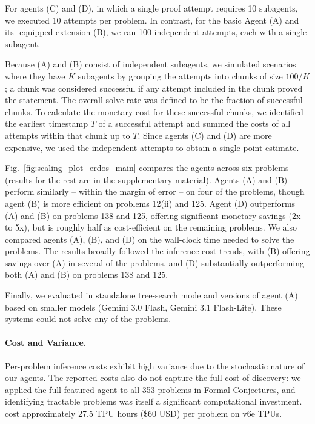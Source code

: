 For agents (C) and (D), in which a single proof attempt requires 10 subagents, 
we executed 10 attempts per problem. In contrast, for the basic Agent (A) and its {\AP}-equipped extension (B), we ran 100 independent attempts, each with a single subagent. 

Because (A) and (B) consist of independent subagents, we simulated scenarios where they have $K$ subagents by grouping the attempts into chunks of size $100/K$; a chunk was considered successful if any attempt included in the chunk proved the statement. The overall solve rate was defined to be the fraction of successful chunks. To calculate the monetary cost for these successful chunks, we identified the earliest timestamp $T$ of a successful attempt and summed the costs of all attempts within that chunk up to $T$. Since 
agents (C) and (D) are more expensive, we used the independent attempts to obtain a single point estimate.

Fig.~\ref{fig:scaling_plot_erdos_main} compares the agents across six {\erdos} problems (results for the rest are in the supplementary material). 
Agents (A) and (B) perform similarly -- within the margin of error -- on four of the problems, though agent (B) is more efficient on problems 12(ii) and 125. Agent (D) outperforms (A) and (B) on problems 138 and 125, offering significant monetary savings (2x to 5x), but is roughly half as cost-efficient on the remaining problems. 
We also compared agents (A), (B), and (D) on the wall-clock time needed to solve the problems. The results broadly followed the inference cost trends, with (B) offering savings over (A) in several of the problems, and (D) substantially outperforming both (A) and (B) on problems 138 and 125.

Finally, we evaluated {\AP} in standalone tree-search mode and versions of agent (A) based on smaller models (Gemini 3.0 Flash, Gemini 3.1 Flash-Lite). These systems could not solve any of the problems.


\paragraph{Cost and Variance.} Per-problem inference costs exhibit high variance due to the stochastic nature of our agents. The reported costs also do not capture the full cost of discovery: we applied the full-featured agent to all 353 {\erdos} problems in Formal Conjectures, and identifying tractable problems was itself a significant computational investment. {\AP} cost approximately 27.5 TPU hours (\$60 USD) per problem on v6e TPUs.


